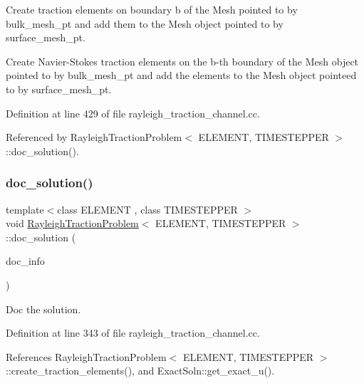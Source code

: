 Create traction elements on boundary b of the Mesh pointed to by bulk\+\_\+mesh\+\_\+pt and add them to the Mesh object pointed to by surface\+\_\+mesh\+\_\+pt. 

Create Navier-\/\+Stokes traction elements on the b-\/th boundary of the Mesh object pointed to by bulk\+\_\+mesh\+\_\+pt and add the elements to the Mesh object pointeed to by surface\+\_\+mesh\+\_\+pt. 

Definition at line 429 of file rayleigh\+\_\+traction\+\_\+channel.\+cc.



Referenced by Rayleigh\+Traction\+Problem$<$ E\+L\+E\+M\+E\+N\+T, T\+I\+M\+E\+S\+T\+E\+P\+P\+E\+R $>$\+::doc\+\_\+solution().

\mbox{\label{classRayleighTractionProblem_a451af703b4a6de97b060884ca71c3ef8}} 
\subsubsection{\texorpdfstring{doc\+\_\+solution()}{doc\_solution()}}
{\footnotesize\ttfamily template$<$class E\+L\+E\+M\+E\+NT , class T\+I\+M\+E\+S\+T\+E\+P\+P\+ER $>$ \\
void \hyperlink{classRayleighTractionProblem}{Rayleigh\+Traction\+Problem}$<$ E\+L\+E\+M\+E\+NT, T\+I\+M\+E\+S\+T\+E\+P\+P\+ER $>$\+::doc\+\_\+solution (\begin{DoxyParamCaption}\item[{Doc\+Info \&}]{doc\+\_\+info }\end{DoxyParamCaption})}



Doc the solution. 



Definition at line 343 of file rayleigh\+\_\+traction\+\_\+channel.\+cc.



References Rayleigh\+Traction\+Problem$<$ E\+L\+E\+M\+E\+N\+T, T\+I\+M\+E\+S\+T\+E\+P\+P\+E\+R $>$\+::create\+\_\+traction\+\_\+elements(), and Exact\+Soln\+::get\+\_\+exact\+\_\+u().

\mbox{\label{classRayleighTractionProblem_ad6394f146505e00aeba2fc37f2c75488}} 
